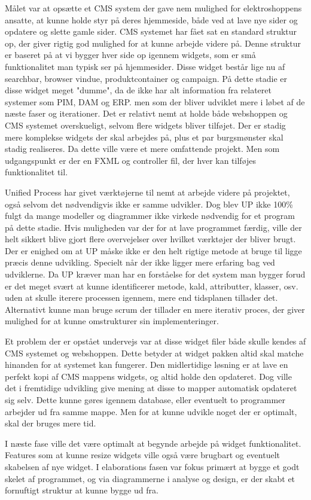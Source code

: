 Målet var at opsætte et CMS system der gave nem mulighed for elektroshoppens ansatte, at kunne holde styr på deres hjemmeside, både ved at lave nye sider og opdatere og slette gamle sider.
CMS systemet har fået sat en standard struktur op, der giver rigtig god mulighed for at kunne arbejde videre på. Denne struktur er baseret på at vi bygger hver side op igennem widgets, som er små funktionalitet man typisk ser på hjemmesider. Disse widget består lige nu af searchbar, browser vindue, produktcontainer og campaign. På dette stadie er disse widget meget "dumme", da de ikke har alt information fra relateret systemer som PIM, DAM og ERP. men som der bliver udviklet mere i løbet af de næste faser og iterationer. Det er relativt nemt at holde både webshoppen og CMS systemet overskueligt, selvom flere widgets bliver tilføjet. Der er stadig mere komplekse widgets der skal arbejdes på, plus et par burgsmønster skal stadig realiseres.  Da dette ville være et mere omfattende projekt. Men som udgangspunkt er der en FXML og controller fil, der hver kan tilføjes funktionalitet til.

Unified Process har givet værktøjerne til nemt at arbejde videre på projektet, også selvom det nødvendigvis ikke er samme udvikler. Dog blev UP ikke 100\% fulgt da mange modeller og diagrammer ikke virkede nødvendig for et program på dette stadie. Hvis muligheden var der for at lave programmet færdig, ville der helt sikkert blive gjort flere overvejelser over hvilket værktøjer der bliver brugt. Der er enighed om at UP måske ikke er den helt rigtige metode at bruge til ligge præcis denne udvikling. Specielt når der ikke ligger mere erfaring bag ved udviklerne. Da UP kræver man har en forståelse for det system man bygger forud er det meget svært at kunne identificerer metode, kald, attributter, klasser, osv. uden at skulle iterere processen igennem, mere end tidsplanen tillader det. Alternativt kunne man bruge scrum der tillader en mere iterativ proces, der giver mulighed for at kunne omstrukturer sin implementeringer.

Et problem der er opstået undervejs var at disse widget filer både skulle kendes af CMS systemet og webshoppen. Dette betyder at widget pakken altid skal matche hinanden for at systemet kan fungerer. Den midlertidige løsning er at lave en perfekt kopi af CMS mappens widgets, og altid holde den opdateret. Dog ville det i fremtidige udvikling give mening at disse to mapper automatisk opdateret sig selv. Dette kunne gøres igennem database, eller eventuelt to programmer arbejder ud fra samme mappe. Men for at kunne udvikle noget der er optimalt, skal der bruges mere tid.
 
 
I næste fase ville det være optimalt at begynde arbejde på widget funktionalitet. Features som at kunne resize widgets ville også være brugbart og eventuelt skabelsen af nye widget.
I elaborations fasen var fokus primært at bygge et godt skelet af programmet, og via diagrammerne i analyse og design, er der skabt et fornuftigt struktur at kunne bygge ud fra.

